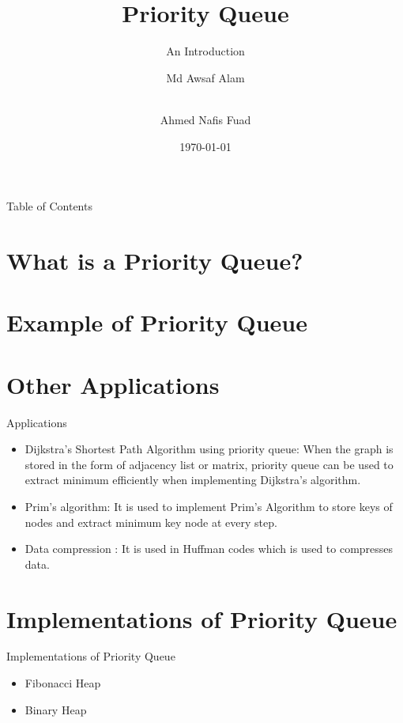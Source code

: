 \documentclass{beamer}
\title[Priority Queue]{Priority Queue}
\subtitle{An Introduction}
\author[Awsaf, Fuad] %
{Md Awsaf Alam\inst{1} \and \\Ahmed Nafis Fuad\inst{1}}
\institute[BUET] %
{
  \inst{1}%
  Department of Computer Science and Engineering\\
  BUET
}
\date{\today}
\begin{document}
\titlepage

\begin{frame}{Table of Contents}
\tableofcontents

\end{frame}

\section{What is a Priority Queue?}



\section{Example of Priority Queue}


\section{Other Applications}
\begin{frame}{Applications}
\begin{itemize}
  \item  Dijkstra’s Shortest Path Algorithm using priority queue: When the graph is stored in the form of adjacency list or matrix, priority queue can be used to extract minimum efficiently when implementing Dijkstra’s algorithm.
  \item  Prim’s algorithm: It is used to implement Prim’s Algorithm to store keys of nodes and extract minimum key node at every step.
  \item  Data compression : It is used in Huffman codes which is used to compresses data.

\end{itemize}

\end{frame}


\section{Implementations of Priority Queue}
\begin{frame}{Implementations of Priority Queue}
\begin{itemize}
  \item Fibonacci Heap
  \item Binary Heap
\end{itemize}

\end{frame}
\end{document}
